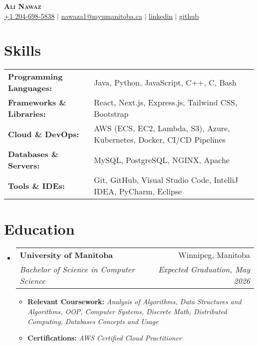 \documentclass[letterpaper,11pt]{article}
\makeatletter
\newcommand{\resumeItem}[1]{
  \item\small{
    {#1 \vspace{-2pt}}
  }
}
\newcommand{\resumeSubheading}[4]{
  \vspace{-2pt}\item
    \begin{tabular*}{0.97\textwidth}[t]{l@{\extracolsep{\fill}}r}
      \textbf{#1} & #2 \\
      \textit{\small#3} & \textit{\small #4} \\
    \end{tabular*}\vspace{-4pt} %
}
\newcommand{\resumeSubHeadingListStart}{\begin{itemize}[leftmargin=0.15in, label={}]}
\newcommand{\resumeSubHeadingListEnd}{\end{itemize}}
\newcommand{\resumeItemListStart}{\begin{itemize}}
\newcommand{\resumeItemListEnd}{\end{itemize}\vspace{-6pt}} %
\makeatother
\begin{document}
\begin{center}
    \textbf{\Huge \scshape Ali Nawaz} \\ \vspace{1pt}
    \small 
     \href{tel:+12046985838}{+1 204-698-5838} $|$ 
     \href{mailto:nawaza1@myumanitoba.ca}{nawaza1@myumanitoba.ca} $|$ 
     \href{https://www.linkedin.com/in/ali-nawaz-385a0b172/}{linkedin} $|$
     \href{https://github.com/Ali90922}{github}
\end{center}

\section{Skills}


\begin{tabularx}{\textwidth}{>{\bfseries}l X}
Programming Languages: & Java, Python, JavaScript, C++, C, Bash \\
Frameworks \& Libraries: & React, Next.js, Express.js, Tailwind CSS, Bootstrap \\
Cloud \& DevOps: & AWS (ECS, EC2, Lambda, S3), Azure, Kubernetes, Docker, CI/CD Pipelines \\
Databases \& Servers: & MySQL, PostgreSQL, NGINX, Apache \\
Tools \& IDEs: & Git, GitHub, Visual Studio Code, IntelliJ IDEA, PyCharm, Eclipse \\
\end{tabularx}



\vspace{-7pt}

\section{Education}
\resumeSubHeadingListStart
    \resumeSubheading
      {University of Manitoba}{Winnipeg, Manitoba}
      {Bachelor of Science in Computer Science}{Expected Graduation, May 2026}
      \resumeItemListStart
        \resumeItem{\textbf{Relevant Coursework:} \textit{Analysis of Algorithms, Data Structures and Algorithms, OOP, Computer Systems, Discrete Math, Distributed Computing, Databases Concepts and Usage}}
        \resumeItem{\textbf{Certifications:} \textit{AWS Certified Cloud Practitioner}}
      \resumeItemListEnd
\resumeSubHeadingListEnd
\end{document}
